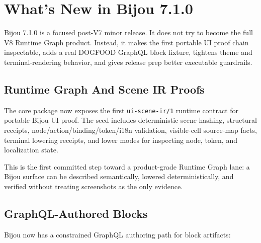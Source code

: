 \chapter{What's New in Bijou 7.1.0}\label{record-282}

\smallskip

Bijou 7.1.0 is a focused post-V7 minor release. It does not try to become the full V8 Runtime Graph product. Instead, it makes the first portable UI proof chain inspectable, adds a real DOGFOOD GraphQL block fixture, tightens theme and terminal-rendering behavior, and gives release prep better executable guardrails.

\section{Runtime Graph And Scene IR Proofs}\label{record-282-runtime-graph-and-scene-ir-proofs}

The core package now exposes the first \texttt{u\allowbreak{}i\allowbreak{}-\allowbreak{}s\allowbreak{}c\allowbreak{}e\allowbreak{}n\allowbreak{}e\allowbreak{}-\allowbreak{}i\allowbreak{}r\allowbreak{}/\allowbreak{}1} runtime contract for portable Bijou UI proof. The seed includes deterministic scene hashing, structural receipts, node/action/binding/token/i18n validation, visible-cell source-map facts, terminal lowering receipts, and lower modes for inspecting node, token, and localization state.

This is the first committed step toward a product-grade Runtime Graph lane: a Bijou surface can be described semantically, lowered deterministically, and verified without treating screenshots as the only evidence.

\section{GraphQL-Authored Blocks}\label{record-282-graphql-authored-blocks}

Bijou now has a constrained GraphQL authoring path for block artifacts:



